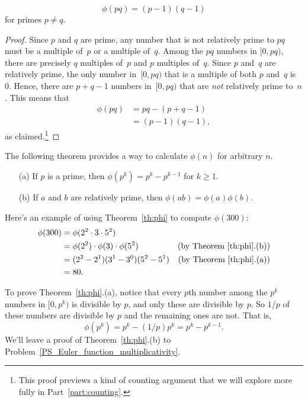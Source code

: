 \begin{lemma}\label{phi_pq}    %
\[
\phi(pq) = (p-1) (q-1)
\]
for primes $p\neq q$.
\end{lemma}

\begin{proof}
Since $p$ and $q$ are prime, any number that is not relatively prime
to $pq$ must be a multiple of~$p$ or a multiple of~$q$.  Among the
$pq$ numbers in $[0, pq)$, there are precisely $q$ multiples of~$p$
and $p$ multiples of~$q$.  Since $p$ and~$q$ are relatively prime, the
only number in~$[0, pq)$ that is a multiple of both $p$ and~$q$ is
0.  Hence, there are $p + q - 1$ numbers in~$[0, pq)$ that are
\emph{not} relatively prime to~$n$.  This means that
\begin{align*}
    \phi(pq) & = pq - (p + q - 1) \\
            & = (p - 1) (q - 1),
\end{align*}
as claimed.\footnote{This proof previews a
  kind of counting argument that we will explore more fully in
  Part~\ref{part:counting}.}  
\end{proof}

The following theorem provides a way to calculate $\phi(n)$ for
arbitrary $n$.
\begin{theorem}\label{th:phi}\mbox{}
\begin{enumerate}
\item[(a)] If $p$ is a prime, then $\phi(p^k) = p^k - p^{k-1}$ for $k \geq 1$.
\item[(b)] If $a$ and $b$ are relatively prime, then $\phi(ab) = \phi(a)\phi(b)$.
\end{enumerate}
\end{theorem}

Here's an example of using Theorem~\ref{th:phi} to compute $\phi(300)$:
\begin{align*}
\phi(300)
    & = \phi(2^2 \cdot 3 \cdot 5^2)\\
    & = \phi(2^2) \cdot \phi(3) \cdot \phi(5^2)
            & \text{(by Theorem~\ref{th:phi}.(b))}\\
    & = (2^2 - 2^1) (3^1 - 3^0) (5^2 - 5^1) 
            & \text{(by Theorem~\ref{th:phi}.(a))}\\
    & = 80.
\end{align*}

To prove Theorem~\ref{th:phi}.(a), notice that every $p$th number
among the $p^k$ numbers in $[0, p^{k})$ is
divisible by $p$, and only these are divisible by $p$.  So $1/p$ of
these numbers are divisible by $p$ and the remaining ones are not.  That is,
\[
\phi(p^{k}) = p^k - (1/p)p^k = p^k -p^{k-1}.
\]
We'll leave a proof of Theorem~\ref{th:phi}.(b) to
Problem~\ref{PS_Euler_function_multiplicativity}.

